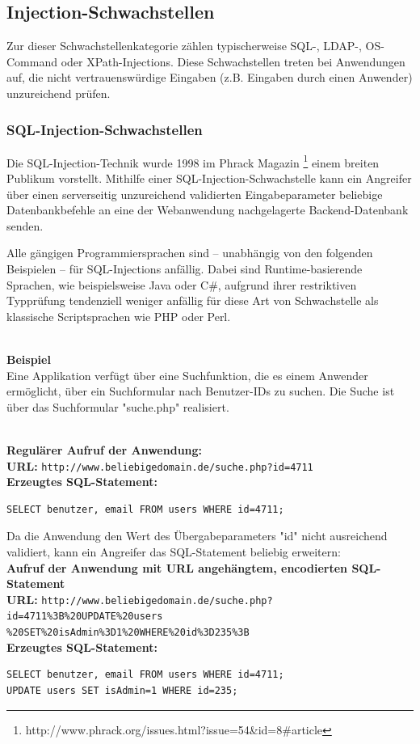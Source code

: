 \subsection{Injection-Schwachstellen}

Zur dieser Schwachstellenkategorie zählen typischerweise SQL-, LDAP-, 
OS-Command oder XPath-Injections. Diese Schwachstellen treten bei 
Anwendungen auf, die nicht vertrauenswürdige Eingaben 
(z.B. Eingaben durch einen Anwender) unzureichend prüfen.


\subsubsection{SQL-Injection-Schwachstellen}

Die SQL-Injection-Technik wurde 1998 im Phrack Magazin
\footnote{http://www.phrack.org/issues.html?issue=54\&id=8\#article} 
einem breiten Publikum vorstellt. Mithilfe einer SQL-Injection-Schwachstelle 
kann ein Angreifer über einen serverseitig unzureichend 
validierten Eingabeparameter beliebige Datenbankbefehle an eine der 
Webanwendung nachgelagerte Backend-Datenbank senden.

Alle gängigen Programmiersprachen sind – unabhängig von den folgenden 
Beispielen – für SQL-Injections anfällig. Dabei sind Runtime-basierende 
Sprachen, wie beispielsweise Java oder C\#, aufgrund ihrer  restriktiven 
Typprüfung tendenziell weniger anfällig für diese Art von Schwachstelle 
als klassische Scriptsprachen wie PHP oder Perl.

\\
\textbf{Beispiel}
\\
Eine Applikation verfügt über eine Suchfunktion, die es einem Anwender 
ermöglicht, über ein Suchformular nach Benutzer-IDs zu suchen. 
Die Suche ist über das Suchformular "suche.php" realisiert.

\\
\textbf{Regulärer Aufruf der Anwendung:}
\\
\textbf{URL:} \texttt{http://www.beliebigedomain.de/suche.php?id=4711}
\\
\textbf{Erzeugtes SQL-Statement:}
\begin{lstlisting}[basicstyle=\ttfamily\footnotesize]
SELECT benutzer, email FROM users WHERE id=4711;
\end{lstlisting}
Da die Anwendung den Wert des Übergabeparameters "id" nicht ausreichend validiert, kann ein Angreifer das SQL-Statement beliebig erweitern:
\\
\textbf{Aufruf der Anwendung mit URL angehängtem, encodierten SQL-Statement}
\\
\textbf{URL:} \texttt{http://www.beliebigedomain.de/suche.php?id=4711\%3B\%20UPDATE\%20users\\\%20SET\%20isAdmin\%3D1\%20WHERE\%20id\%3D235\%3B}
\\
\textbf{Erzeugtes SQL-Statement:}
\begin{lstlisting}[basicstyle=\ttfamily\footnotesize]
SELECT benutzer, email FROM users WHERE id=4711; 
UPDATE users SET isAdmin=1 WHERE id=235;
\end{lstlisting}


